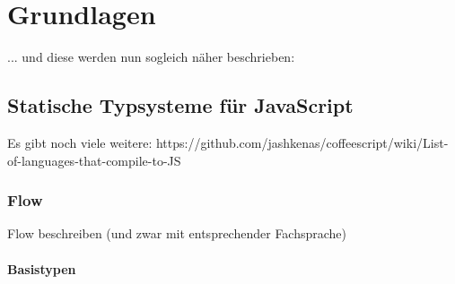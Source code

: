 \chapter{Grundlagen}
\label{chap:basics}

... und diese werden nun sogleich näher beschrieben:

\section{Statische Typsysteme für JavaScript}

Es gibt noch viele weitere: https://github.com/jashkenas/coffeescript/wiki/List-of-languages-that-compile-to-JS

\subsection{Flow}
  Flow beschreiben (und zwar mit entsprechender Fachsprache)

\subsubsection{Basistypen}

